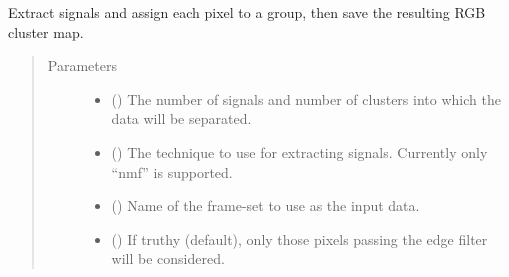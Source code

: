 \documentclass[letterpaper,10pt,english]{sphinxmanual}
\begin{document}
\begin{fulllineitems}
\begin{fulllineitems}
\begin{quote}
\begin{description}
\end{description}\end{quote}

\end{fulllineitems}


\begin{fulllineitems}
\label{\detokenize{xanespy:xanespy.xanes_frameset.XanesFrameset.calculate_signals}}
Extract signals and assign each pixel to a group, then save the
resulting RGB cluster map.
\begin{quote}\begin{description}
\item[{Parameters}] \leavevmode\begin{itemize}
\item {} 
 (\sphinxstyleliteralemphasis{, }) \textendash{} The number of signals and number of clusters into which the
data will be separated.

\item {} 
 (\sphinxstyleliteralemphasis{, }) \textendash{} The technique to use for extracting signals. Currently only
“nmf” is supported.

\item {} 
 (\sphinxstyleliteralemphasis{, }) \textendash{} Name of the frame-set to use as the input data.

\item {} 
 (\sphinxstyleliteralemphasis{, }) \textendash{} If truthy (default), only those pixels passing the edge
filter will be considered.

\end{itemize}

\end{description}\end{quote}

\end{fulllineitems}


\end{fulllineitems}
\end{document}
